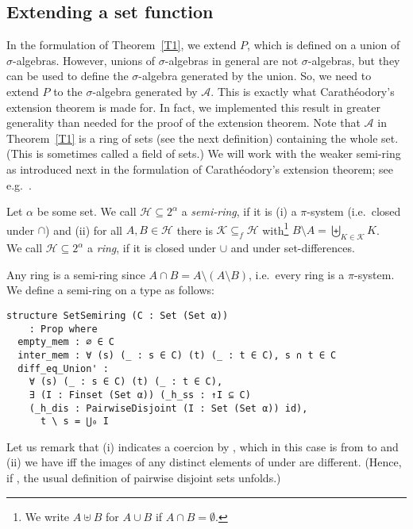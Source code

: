 \documentclass[lean]{DraftAFM}
\begin{document}
\subsection{Extending a set function}
In the formulation of Theorem~\ref{T1}, we extend $P$, which is
defined on a union of $\sigma$-algebras. However, unions of
$\sigma$-algebras in general are not $\sigma$-algebras, but they can
be used to define the $\sigma$-algebra generated by the union. So, we
need to extend $P$ to the $\sigma$-algebra generated by $\mathcal
A$. This is exactly what Carathéodory's extension theorem is made
for. In fact, we implemented this result in greater generality than
needed for the proof of the extension theorem. Note that $\mathcal A$
in Theorem~\ref{T1} is a ring of sets (see the next definition)
containing the whole set. (This is sometimes called a field of sets.)
We will work with the weaker semi-ring as introduced next in the
formulation of Carathéodory's extension theorem; see
e.g.\ \cite[Definition~1.9]{Klenke2013}.

\begin{definition}\label{def:semi}
  Let $\alpha$ be some set. We call $\mathcal H \subseteq 2^\alpha$ a
  \emph{semi-ring}, if it is (i) a $\pi$-system (i.e.\ closed under
  $\cap$) and (ii) for all $A, B \in\mathcal H$ there is $\mathcal K
  \subseteq_f \mathcal H$ with\footnote{We write $A\uplus B$ for
    $A\cup B$ if $A\cap B=\emptyset$.}  $B\setminus A = \biguplus_{K
    \in \mathcal K} K$.  \\ We call $\mathcal H \subseteq 2^\alpha$ a
  \emph{ring}, if it is closed under $\cup$ and under set-differences.
\end{definition}

\noindent
Any ring is a semi-ring since $A\cap B = A \setminus (A \setminus B)$,
i.e.\ every ring is a $\pi$-system.
We define a semi-ring on a type  as follows:

\begin{verbatim}
structure SetSemiring (C : Set (Set α))
    : Prop where
  empty_mem : ∅ ∈ C
  inter_mem : ∀ (s) (_ : s ∈ C) (t) (_ : t ∈ C), s ∩ t ∈ C
  diff_eq_Union' :
    ∀ (s) (_ : s ∈ C) (t) (_ : t ∈ C),
    ∃ (I : Finset (Set α)) (_h_ss : ↑I ⊆ C)
    (_h_dis : PairwiseDisjoint (I : Set (Set α)) id),
      t \ s = ⋃₀ I
\end{verbatim}

Let us remark that (i)  indicates a coercion by
, which in this case is from  to
 and (ii) we have 
iff the images of any distinct elements of 
under  are different. (Hence, if , the
usual definition of pairwise disjoint sets unfolds.)
\end{document}
